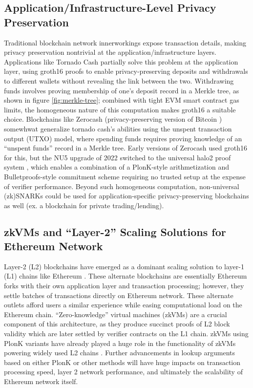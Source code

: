\subsection{Application/Infrastructure-Level Privacy Preservation}
\noindent Traditional blockchain network innerworkings expose transaction details, making privacy preservation nontrivial at the application/infrastructure layers. Applications like Tornado Cash \cite{tornadocash} partially solve this problem at the application layer, using groth16 proofs to enable privacy-preserving deposits and withdrawals to different wallets without revealing the link between the two. Withdrawing funds involves proving membership of one's deposit record in a Merkle tree, as shown in figure \ref{fig:merkle-tree}; combined with tight EVM smart contract gas limits, the homogeneous nature of this computation makes groth16 a suitable choice. Blockchains like Zerocash \cite{zcash} (privacy-preserving version of Bitcoin \cite{bitcoin}) somewhwat generalize tornado cash's abilities using the unspent transaction output (UTXO) model, where spending funds requires proving knowledge of an ``unspent funds'' record in a Merkle tree. Early versions of Zerocash used groth16 for this, but the NU5 upgrade of 2022 switched to the universal halo2 proof system \cite{halo2}, which enables a combination of a PlonK-style arithmetization and Bulletproofs-style commitment scheme \cite{bulletproofs} requiring no trusted setup at the expense of verifier performance. Beyond such homogeneous computation, non-universal (zk)SNARKs could be used for application-specific privacy-preserving blockchains as well (ex. a blockchain for private trading/lending). 

\subsection{zkVMs and ``Layer-2'' Scaling Solutions for Ethereum Network}
\noindent Layer-2 (L2) blockchains \cite{l2survey} have emerged as a dominant scaling solution to layer-1 (L1) chains like Ethereum \cite{ethereum}. These alternate blockchains are essentially Ethereum forks with their own application layer and transaction processing; however, they settle batches of transactions directly on Ethereum network. These alternate outlets afford users a similar experience while easing computational load on the Ethereum chain. ``Zero-knowledge'' virtual machines (zkVMs) \cite{scrollzkevm, polygonzkevm, sp1, risc0, openvm} are a crucial component of this architecture, as they produce succinct proofs of L2 block validity which are later settled by verifier contracts on the L1 chain. zkVMs using PlonK variants \cite{scrollzkevm} have already played a huge role in the functionality of zkVMs powering widely used L2 chains \cite{scrollarch}. Further advancements in lookup arguments based on either PlonK or other methods will have huge impacts on transaction processing speed, layer 2 network performance, and ultimately the scalability of Ethereum network itself.  

